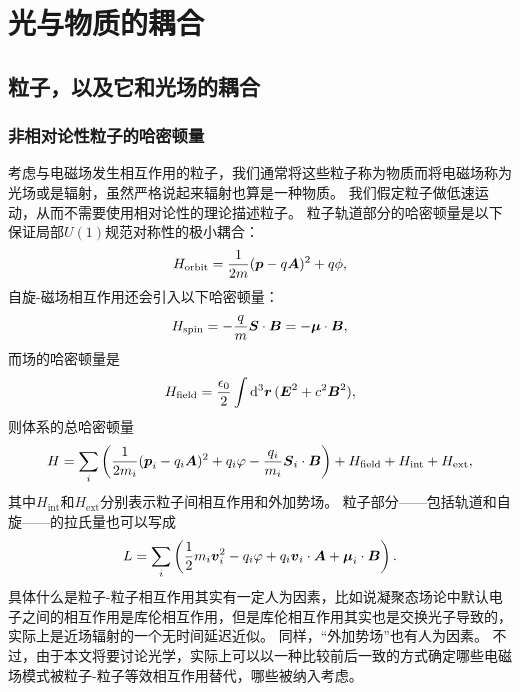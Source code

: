\section{光与物质的耦合}

\subsection{粒子，以及它和光场的耦合}

\subsubsection{非相对论性粒子的哈密顿量}

考虑与电磁场发生相互作用的粒子，我们通常将这些粒子称为物质而将电磁场称为光场或是辐射，虽然严格说起来辐射也算是一种物质。
我们假定粒子做低速运动，从而不需要使用相对论性的理论描述粒子。
粒子轨道部分的哈密顿量是以下保证局部$U(1)$规范对称性的极小耦合：
\begin{equation}
    {H}_\text{orbit} = \frac{1}{2m} ({\vb*{p}} - q \vb*{A})^2 + q \phi,
    \label{eq:minimal-coupling}
\end{equation}
自旋-磁场相互作用还会引入以下哈密顿量：
\begin{equation}
    {H}_\text{spin} = - \frac{q}{m} {\vb*{S}} \cdot \vb*{B} = - \vb*{\mu} \cdot \vb*{B},
\end{equation}
而场的哈密顿量是
\begin{equation}
    {H}_\text{field} = \frac{\epsilon_0}{2} \int \dd[3]{\vb*{r}} (\vb*{E}^2 + c^2 \vb*{B}^2),
\end{equation}
则体系的总哈密顿量
\begin{equation}
    {H} = \sum_i \left( \frac{1}{2m_i} ({\vb*{p}_i} - q_i \vb*{A})^2 + q_i \varphi - \frac{q_i}{m_i} \vb*{S}_i \cdot \vb*{B} \right) + {H}_\text{field} + {H}_\text{int} + {H}_\text{ext},
\end{equation}
其中${H}_\text{int}$和${H}_\text{ext}$分别表示粒子间相互作用和外加势场。
粒子部分——包括轨道和自旋——的拉氏量也可以写成
\begin{equation}
    L = \sum_i \left( \frac{1}{2} m_i \vb*{v}_i^2 - q_i \varphi + q_i \vb*{v}_i \cdot \vb*{A} + \vb*{\mu}_i \cdot \vb*{B} \right).
\end{equation}
具体什么是粒子-粒子相互作用其实有一定人为因素，比如说凝聚态场论中默认电子之间的相互作用是库伦相互作用，但是库伦相互作用其实也是交换光子导致的，实际上是近场辐射的一个无时间延迟近似。
同样，“外加势场”也有人为因素。
不过，由于本文将要讨论光学，实际上可以以一种比较前后一致的方式确定哪些电磁场模式被粒子-粒子等效相互作用替代，哪些被纳入考虑。
